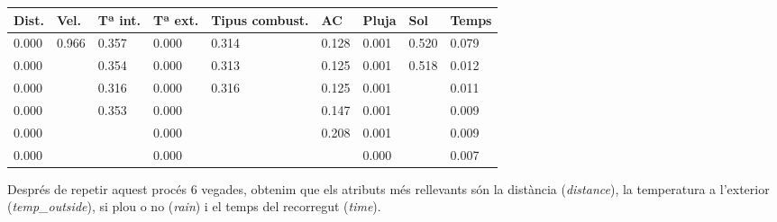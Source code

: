 \documentclass[a4paper, 11pt]{article}
\begin{document}
        \begin{table}[H]
            \centering
            \begin{tabular}{|l|l|l|l|l|l|l|l|l|}
                \hline
                \textbf{Dist.} & \textbf{Vel.}            & \textbf{Tª int.} & \textbf{Tª ext.} & \textbf{Tipus combust.}  & \textbf{AC} & \textbf{Pluja} & \textbf{Sol}                        & \textbf{Temps} \\ \hline
                0.000              & 0.966                    & 0.357                               & 0.000                              & 0.314                    & 0.128                         & 0.001          & 0.520                    & 0.079          \\ \hline
                0.000              & \cellcolor[HTML]{C0C0C0} & 0.354                               & 0.000                              & 0.313                    & 0.125                         & 0.001          & 0.518                    & 0.012          \\ \hline
                0.000              & \cellcolor[HTML]{C0C0C0} & 0.316                               & 0.000                              & 0.316                    & 0.125                         & 0.001          & \cellcolor[HTML]{C0C0C0} & 0.011          \\ \hline
                0.000              & \cellcolor[HTML]{C0C0C0} & 0.353                               & 0.000                              & \cellcolor[HTML]{C0C0C0} & 0.147                         & 0.001          & \cellcolor[HTML]{C0C0C0} & 0.009          \\ \hline
                0.000              & \cellcolor[HTML]{C0C0C0} & \cellcolor[HTML]{C0C0C0}            & 0.000                              & \cellcolor[HTML]{C0C0C0} & 0.208                         & 0.001          & \cellcolor[HTML]{C0C0C0} & 0.009          \\ \hline
                0.000              & \cellcolor[HTML]{C0C0C0} & \cellcolor[HTML]{C0C0C0}            & 0.000                              & \cellcolor[HTML]{C0C0C0} & \cellcolor[HTML]{C0C0C0}      & 0.000          & \cellcolor[HTML]{C0C0C0} & 0.007          \\ \hline
            \end{tabular}
        \end{table}

        Després de repetir aquest procés 6 vegades, obtenim que els atributs més rellevants són la
        distància (\textit{distance}), la temperatura a l'exterior (\textit{temp\_outside}), si
        plou o no (\textit{rain}) i el temps del recorregut (\textit{time}).\\
\end{document}
